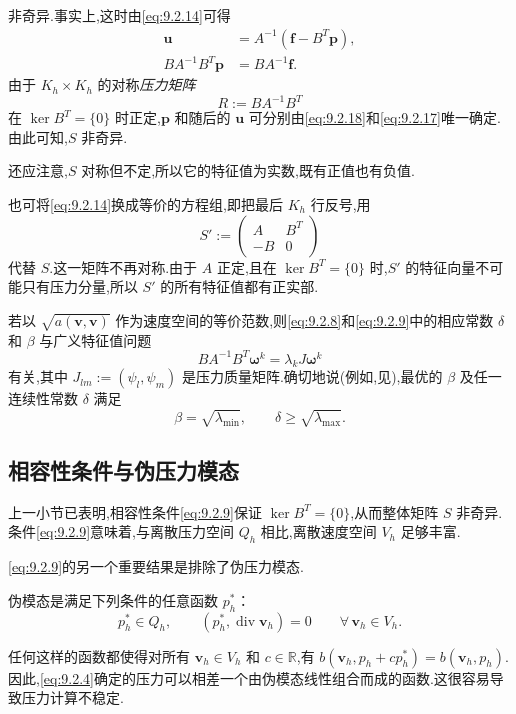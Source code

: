 非奇异.事实上,这时由\eqref{eq:9.2.14}可得
\begin{align}
  \boldsymbol{u}&=A^{-1}(\boldsymbol{f}-B^T\boldsymbol{p}),\label{eq:9.2.17}\\
  BA^{-1}B^T\boldsymbol{p}&=BA^{-1}\boldsymbol{f}.\label{eq:9.2.18}
\end{align}
由于 \(K_h\times K_h\) 的对称\emph{压力矩阵}
\begin{equation}\label{eq:9.2.19}
  R:=BA^{-1}B^T
\end{equation}
在 \(\ker B^T=\{0\}\) 时正定,\(\boldsymbol{p}\) 和随后的 \(\boldsymbol{u}\) 可分别由\eqref{eq:9.2.18}和\eqref{eq:9.2.17}唯一确定.由此可知,\(S\) 非奇异.

还应注意,\(S\) 对称但不定,所以它的特征值为实数,既有正值也有负值.

也可将\eqref{eq:9.2.14}换成等价的方程组,即把最后 \(K_h\) 行反号,用
\begin{equation}\label{eq:9.2.20}
  S':=\begin{pmatrix}A&B^T\\-B&0\end{pmatrix}
\end{equation}
代替 \(S\).这一矩阵不再对称.由于 \(A\) 正定,且在 \(\ker B^T=\{0\}\) 时,\(S'\) 的特征向量不可能只有压力分量,所以 \(S'\) 的所有特征值都有正实部.

若以 \(\sqrt{a(\boldsymbol{v},\boldsymbol{v})}\) 作为速度空间的等价范数,则\eqref{eq:9.2.8}和\eqref{eq:9.2.9}中的相应常数 \(\delta\) 和 \(\beta\) 与广义特征值问题
\[
  BA^{-1}B^T\boldsymbol{\omega}^k=\lambda_k J\boldsymbol{\omega}^k
\]
有关,其中 \(J_{lm}:=(\psi_l,\psi_m)\) 是压力质量矩阵.确切地说(例如,见),最优的 \(\beta\) 及任一连续性常数 \(\delta\) 满足
\[
  \beta=\sqrt{\lambda_{\min}},\qquad \delta\ge\sqrt{\lambda_{\max}}.
\]

\subsection{相容性条件与伪压力模态}\label{sec:9.2.2}

上一小节已表明,相容性条件\eqref{eq:9.2.9}保证 \(\ker B^T=\{0\}\),从而整体矩阵 \(S\) 非奇异.条件\eqref{eq:9.2.9}意味着,与离散压力空间 \(Q_h\) 相比,离散速度空间 \(V_h\) 足够丰富.

\eqref{eq:9.2.9}的另一个重要结果是排除了伪压力模态.
\begin{definition*}
伪模态是满足下列条件的任意函数 \(p_h^*\)：
\begin{equation}\label{eq:9.2.21}
  p_h^*\in Q_h,\qquad (p_h^*,\operatorname{div}\boldsymbol{v}_h)=0
      \qquad\forall\,\boldsymbol{v}_h\in V_h.
\end{equation}
\end{definition*}
任何这样的函数都使得对所有 \(\boldsymbol{v}_h\in V_h\) 和 \(c\in\mathbb R\),有
\(b(\boldsymbol{v}_h,p_h+cp_h^*)=b(\boldsymbol{v}_h,p_h)\).因此,\eqref{eq:9.2.4}确定的压力可以相差一个由伪模态线性组合而成的函数.这很容易导致压力计算不稳定.

